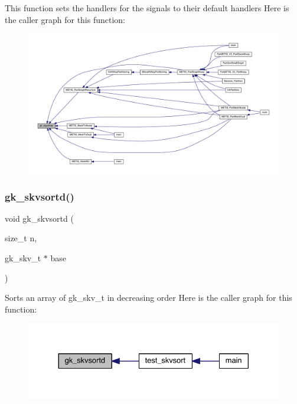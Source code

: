 This function sets the handlers for the signals to their default handlers Here is the caller graph for this function\+:\nopagebreak
\begin{figure}[H]
\begin{center}
\leavevmode
\includegraphics[width=350pt]{a00077_a08f287b6dbdc0779c916ecbd49540a1e_icgraph}
\end{center}
\end{figure}
\mbox{\label{a00077_a54ca33a34b7cfbd130a8af3d8b07405e}} 
\subsubsection{\texorpdfstring{gk\+\_\+skvsortd()}{gk\_skvsortd()}}
{\footnotesize\ttfamily void gk\+\_\+skvsortd (\begin{DoxyParamCaption}\item[{size\+\_\+t}]{n,  }\item[{gk\+\_\+skv\+\_\+t $\ast$}]{base }\end{DoxyParamCaption})}

Sorts an array of gk\+\_\+skv\+\_\+t in decreasing order Here is the caller graph for this function\+:\nopagebreak
\begin{figure}[H]
\begin{center}
\leavevmode
\includegraphics[width=330pt]{a00077_a54ca33a34b7cfbd130a8af3d8b07405e_icgraph}
\end{center}
\end{figure}
\mbox{\label{a00077_ad540fc9b43ce41269f7f33712f5f71c2}} 
